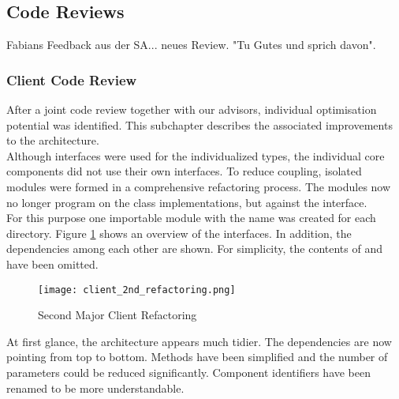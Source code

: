 \subsection{Code Reviews}
Fabians Feedback aus der SA... neues Review. "Tu Gutes und sprich davon".

\subsubsection{Client Code Review}
After a joint code review together with our advisors, individual optimisation potential was identified.
This subchapter describes the associated improvements to the architecture. \\

Although interfaces were used for the individualized types,
the individual core components did not use their own interfaces.
To reduce coupling, isolated modules were formed in a comprehensive refactoring process.
The modules now no longer program on the class implementations, but against the interface. \\

For this purpose one importable module with the name  was created for each directory.
Figure \ref{fig:client_2nd_refactoring} shows an overview of the interfaces.
In addition, the dependencies among each other are shown.
For simplicity, the contents of  and  have been omitted. \\

\begin{figure}[H]
    \centering
    \texttt{[image: client\_2nd\_refactoring.png]}
    \caption{Second Major Client Refactoring}
    \label{fig:client_2nd_refactoring}
\end{figure}

At first glance, the architecture appears much tidier.
The dependencies are now pointing from top to bottom.
Methods have been simplified and the number of parameters could be reduced significantly.
Component identifiers have been renamed to be more understandable. \\

